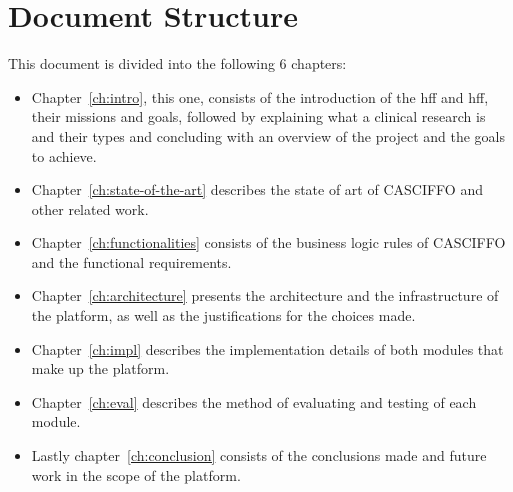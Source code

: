 \section{Document Structure}
This document is divided into the following 6 chapters: 

\begin{itemize}

    \item Chapter~\ref{ch:intro}, this one, consists of the introduction of the \acrshort{hff} and \acrshort{hff}, their missions and goals, followed by explaining what a clinical research is and their types and concluding with an overview of the project and the goals to achieve. 

    \item Chapter~\ref{ch:state-of-the-art} describes the state of art of CASCIFFO and other related work.

    \item Chapter~\ref{ch:functionalities} consists of the business logic rules of CASCIFFO and the functional requirements. 

    \item Chapter~\ref{ch:architecture} presents the architecture and the infrastructure of the platform, as well as the justifications for the choices made. 

    \item Chapter~\ref{ch:impl} describes the implementation details of both modules that make up the platform. 

    \item Chapter~\ref{ch:eval} describes the method of evaluating and testing of each module.

    \item Lastly chapter~\ref{ch:conclusion} consists of the conclusions made and future work in the scope of the platform.

\end{itemize}
